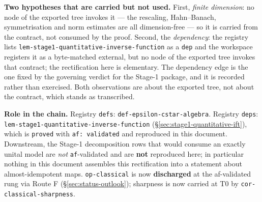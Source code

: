 \noindent\textbf{Two hypotheses that are carried but not used.} First, \emph{finite
dimension}: no node of the exported tree invokes it --- the rescaling, Hahn--Banach,
symmetrisation and norm estimates are all dimension-free --- so it is carried from the
contract, not consumed by the proof. Second, the \emph{dependency}: the registry lists
\texttt{lem-stage1-quantitative-inverse-function} as a \texttt{dep} and the workspace
registers it as a byte-matched external, but no node of the exported tree invokes that
contract; the rectification here is elementary. The dependency edge is the one fixed by the
governing verdict for the Stage-1 package, and it is recorded rather than exercised. Both
observations are about the exported tree, not about the contract, which stands as
transcribed.

\noindent\textbf{Role in the chain.} Registry \texttt{defs}:
\texttt{def-epsilon-cstar-algebra}. Registry \texttt{deps}:
\texttt{lem-stage1-quantitative-inverse-function}
(\S\ref{sec:stage1-quantitative-ift}), which is \texttt{proved} with \texttt{af: validated}
and reproduced in this document. Downstream, the Stage-1 decomposition rows that would
consume an exactly unital model are \emph{not} \texttt{af}-validated and are \textbf{not}
reproduced here; in particular nothing in this document assembles this rectification into a
statement about almost-idempotent maps. \texttt{op-classical} is now \textbf{discharged} at the af-validated rung via Route F (\S\ref{sec:status-outlook}); sharpness is now carried at T0 by \texttt{cor-classical-sharpness}.
